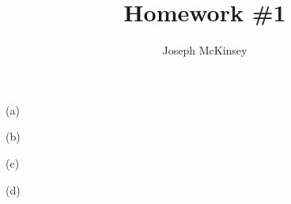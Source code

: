 \documentclass{hw}
\title{Homework \#1}
\author{Joseph McKinsey}
\begin{document}
\maketitle

\begin{question}[1]
(a)

(b)

(c)

(d)
\end{question}
\end{document}
